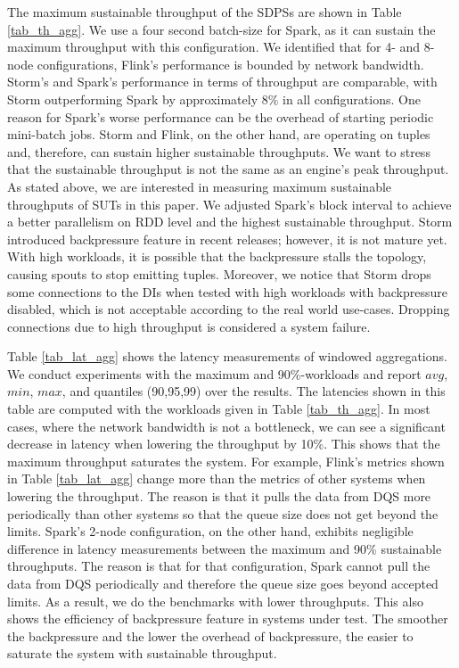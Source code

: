 The maximum sustainable throughput of the SDPSs are shown in Table \ref{tab_th_agg}. We use a four second batch-size for  Spark, as it can sustain the  maximum throughput with this configuration. We identified that for 4- and 8-node configurations, Flink's performance is bounded by network bandwidth.  Storm's and Spark's performance in terms of throughput are comparable, with Storm outperforming Spark by approximately 8\% in all configurations. One reason for Spark's worse performance can be the  overhead of starting periodic  mini-batch jobs. %
Storm and Flink, on the other hand, are operating on tuples and, therefore, can sustain higher sustainable throughputs. %
 We want to stress that the sustainable throughput is not the same as an engine's peak throughput. %
 As stated above, we are interested in measuring maximum sustainable  throughputs of SUTs in this paper.  We adjusted Spark's block interval to achieve a better parallelism on RDD level and the highest sustainable throughput. Storm introduced  backpressure feature in recent releases; however, it is not mature yet. With high workloads, it is possible that the backpressure stalls the topology, causing spouts to stop emitting tuples. Moreover, we notice that Storm  drops some connections to the DIs when tested with high workloads with backpressure disabled, which is not acceptable according to the real world use-cases. Dropping connections due to high throughput is considered  a system failure.


Table \ref{tab_lat_agg} shows the latency measurements of windowed aggregations. We conduct experiments with the maximum and 90\%-workloads and report $avg$, $min$, $max$, and  quantiles (90,95,99) over the results. %
 The latencies shown in this table are computed with the workloads given in Table \ref{tab_th_agg}.  In most cases, where the network bandwidth is not a bottleneck, we can see a significant decrease in latency when lowering the throughput by 10\%. This shows that the maximum throughput saturates the system.  For example, Flink's metrics shown in Table  \ref{tab_lat_agg} change more than the metrics of other systems when lowering the throughput. The reason is that it pulls the data from DQS more periodically than other systems so that the queue size does not get beyond the limits. 
 Spark's 2-node configuration, on the other hand, exhibits negligible difference in latency measurements between the maximum and 90\% sustainable throughputs.  The reason is that for that configuration, Spark cannot pull the data from DQS periodically and therefore the queue size goes beyond accepted limits. As a result, we do the benchmarks with lower throughputs. 
This also shows the efficiency of backpressure feature in systems under test. The smoother the backpressure and the lower the overhead of backpressure, the easier to saturate the system with sustainable throughput. 

